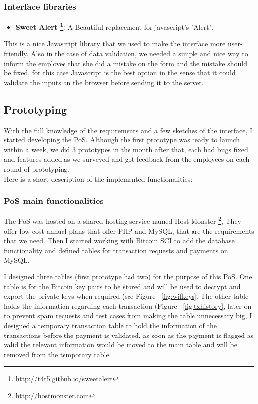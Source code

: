 \subsubsection{Interface libraries}
\begin{itemize}
\item \textbf{Sweet Alert \footnote{\url{http://t4t5.github.io/sweetalert}}: }  A Beautiful replacement for javascript's "Alert", 
\end{itemize}

This is a nice Javascript library that we used to make the interface more user-friendly. Also in the case of data validation, we needed a simple and nice way to inform the employee that she did a mistake on the form and the mistake should be fixed, for this case Javascript is the best option in the sense that it could validate the inputs on the browser before sending it to the server.


\subsection{Prototyping}
With the full knowledge of the requirements and a few sketches of the interface, I started developing the PoS. Although the first prototype was ready to launch within a week, we did 3 prototypes in the month after that, each had bugs fixed and features added as we surveyed and got feedback from the employees on each round of prototyping.
\\
Here is a short description of the implemented functionalities:

\subsubsection{PoS main functionalities}
The PoS was hosted on a shared hosting service named Host Monster \footnote{\url{http://hostmonster.com}}, They offer low cost annual plans that offer PHP and MySQL, that are the requirements that we need.
Then I started working with Bitcoin SCI to add the database functionality and defined tables for transaction requests and payments on MySQL.

I designed three tables (first prototype had two) for the purpose of this PoS. One table is for the Bitcoin key pairs to be stored and will be used to decrypt and export the private keys when required (see Figure ~\ref{fig:wifkeys}. The other table holds the information regarding each transaction (Figure ~\ref{fig:txhistory}, later on to prevent spam requests and test cases from making the table unnecessary big, I designed a temporary transaction table to hold the information of the transactions before the payment is validated, as soon as the payment is flagged as valid the relevant information would be moved to the main table and will be removed from the temporary table.

